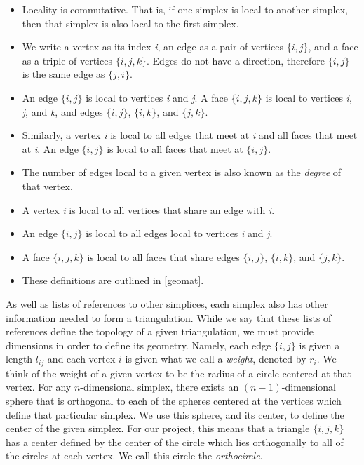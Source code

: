 \documentclass[12pt]{article}
\begin{document}
\begin{itemize}
\item Locality is commutative. That is, if one simplex is local to another simplex, then that simplex is also local to the first simplex.
\item We write a vertex as its index \textit{i}, an edge as a pair of vertices $\{i, j\}$, and a face as a triple of vertices $\{i, j, k\}$. Edges do not have a direction, therefore $\{i, j\}$ is the same edge as $\{j, i\}$. 
\item An edge $\{i, j\}$ is local to vertices \textit{i} and \textit{j}. A face $\{i, j, k\}$ is local to vertices \textit{i}, \textit{j}, and \textit{k}, and edges $\{i, j\}$, $\{i, k\}$, and $\{j, k\}$.
\item Similarly, a vertex \textit{i} is local to all edges that meet at \textit{i} and all faces that meet at \textit{i}. An edge $\{i, j\}$ is local to all faces that meet at $\{i, j\}$.
\item The number of edges local to a given vertex is also known as the \textit{degree} of that vertex.
\item A vertex \textit{i} is local to all vertices that share an edge with \textit{i}.
\item An edge $\{i, j\}$ is local to all edges local to vertices \textit{i} and \textit{j}.
\item A face $\{i, j, k\}$ is local to all faces that share edges $\{i, j\}$, $\{i, k\}$, and $\{j, k\}$.
\item These definitions are outlined in \ref{geomat}.
\end{itemize}

\noindent As well as lists of references to other simplices, each simplex also has other information needed to form a triangulation. While we say that these lists of references define the topology of a given triangulation, we must provide dimensions in order to define its geometry. Namely, each edge $\{i, j\}$ is given a length $l_{ij}$ and each vertex $i$ is given what we call a \textit{weight}, denoted by $r_i$. We think of the weight of a given vertex to be the radius of a circle centered at that vertex. For any $\textit{n}$-dimensional simplex, there exists an $(n-1)$-dimensional sphere that is orthogonal to each of the spheres centered at the vertices which define that particular simplex\cite{Dave}. We use this sphere, and its center, to define the center of the given simplex. For our project, this means that a triangle $\{i, j, k\}$ has a center defined by the center of the circle which lies orthogonally to all of the circles at each vertex. We call this circle the \textit{orthocircle}. \newline
\end{document}
